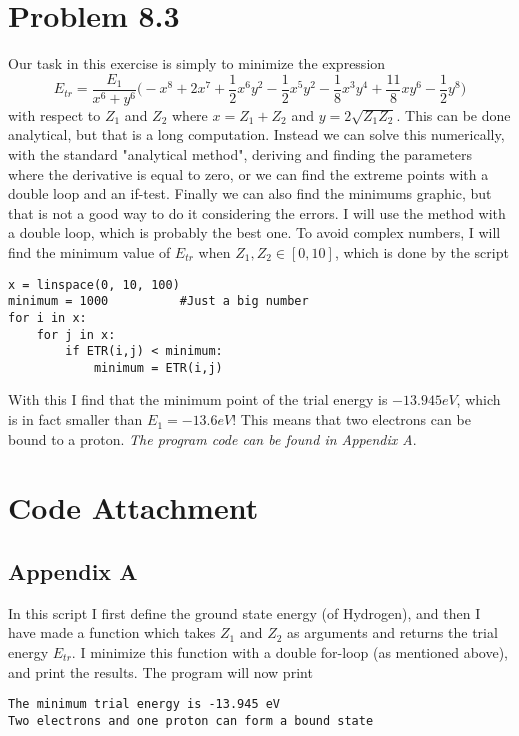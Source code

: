 \documentclass{scrartcl}
\begin{document}
\section*{Problem 8.3}
Our task in this exercise is simply to minimize the expression
\begin{equation}
E_{tr}=\frac{E_1}{x^6+y^6}\bigg(-x^8+2x^7+\frac{1}{2}x^6y^2-\frac{1}{2}x^5y^2-\frac{1}{8}x^3y^4+\frac{11}{8}xy^6-\frac{1}{2}y^8\bigg)
\end{equation}
with respect to $Z_1$ and $Z_2$ where $x=Z_1+Z_2$ and $y=2\sqrt{Z_1Z_2}$. This can be done analytical, but that is a long computation. Instead we can solve this numerically, with the standard "analytical method", deriving and finding the parameters where the derivative is equal to zero, or we can find the extreme points with a double loop and an if-test. Finally we can also find the minimums graphic, but that is not a good way to do it considering the errors. I will use the method with a double loop, which is probably the best one. To avoid complex numbers, I will find the minimum value of $E_{tr}$ when $Z_1,Z_2\in[0,10]$, which is done by the script
\begin{lstlisting}
x = linspace(0, 10, 100)
minimum = 1000			#Just a big number
for i in x:
    for j in x:
        if ETR(i,j) < minimum:
            minimum = ETR(i,j)
\end{lstlisting}
With this I find that the minimum point of the trial energy is $-13.945 eV$, which is in fact smaller than $E_1=-13.6 eV$! This means that two electrons can be bound to a proton. \newline
\textit{The program code can be found in Appendix A}.

\section*{Code Attachment}
\subsection*{Appendix A}

In this script I first define the ground state energy (of Hydrogen), and then I have made a function which takes $Z_1$ and $Z_2$ as arguments and returns the trial energy $E_{tr}$. I minimize this function with a double for-loop (as mentioned above), and print the results. The program will now print
\begin{lstlisting}
The minimum trial energy is -13.945 eV
Two electrons and one proton can form a bound state
\end{lstlisting}
\end{document}
